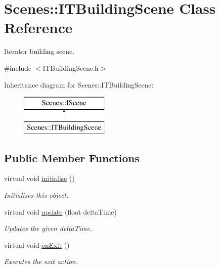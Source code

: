 \hypertarget{class_scenes_1_1_i_t_building_scene}{\section{Scenes\-:\-:I\-T\-Building\-Scene Class Reference}
\label{class_scenes_1_1_i_t_building_scene}
}


Iterator building scene.  




{\ttfamily \#include $<$I\-T\-Building\-Scene.\-h$>$}

Inheritance diagram for Scenes\-:\-:I\-T\-Building\-Scene\-:\begin{figure}[H]
\begin{center}
\leavevmode
\includegraphics[height=2.000000cm]{class_scenes_1_1_i_t_building_scene}
\end{center}
\end{figure}
\subsection*{Public Member Functions}
\begin{DoxyCompactItemize}
\item 
\hypertarget{class_scenes_1_1_i_t_building_scene_a2585d014b85892ceaad3c933ddb692ab}{virtual void \hyperlink{class_scenes_1_1_i_t_building_scene_a2585d014b85892ceaad3c933ddb692ab}{initialise} ()}\label{class_scenes_1_1_i_t_building_scene_a2585d014b85892ceaad3c933ddb692ab}

\begin{DoxyCompactList}\small\item\em Initialises this object. \end{DoxyCompactList}\item 
virtual void \hyperlink{class_scenes_1_1_i_t_building_scene_acc67b30b6a5f3d47b55c1d7366f2668c}{update} (float delta\-Time)
\begin{DoxyCompactList}\small\item\em Updates the given delta\-Time. \end{DoxyCompactList}\item 
\hypertarget{class_scenes_1_1_i_t_building_scene_a6009eb7e3ef0715b898157c3b29b9298}{virtual void \hyperlink{class_scenes_1_1_i_t_building_scene_a6009eb7e3ef0715b898157c3b29b9298}{on\-Exit} ()}\label{class_scenes_1_1_i_t_building_scene_a6009eb7e3ef0715b898157c3b29b9298}

\begin{DoxyCompactList}\small\item\em Executes the exit action. \end{DoxyCompactList}\end{DoxyCompactItemize}



